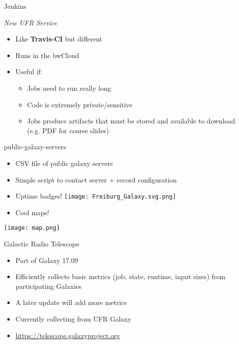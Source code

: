 \documentclass[12pt]{ufrslides}
\begin{document}
	{%
		\begin{frame}[plain]
		\end{frame}
	}

	\begin{frame}{Jenkins}
		\begin{center}
			\emph{New UFR Service}
		\end{center}
		\begin{itemize}
			\item Like \textbf{Travis-CI} but different
			\item Runs in the bwCloud
			\item Useful if:
				\begin{itemize}
					\item Jobs need to run really long
					\item Code is extremely private/sensitive
					\item Jobs produce artifacts that must be stored and
						available to download (e.g. PDF for course slides)
				\end{itemize}
		\end{itemize}
	\end{frame}

	\begin{frame}{public-galaxy-servers}
		\begin{itemize}
			\item CSV file of public galaxy servers
			\item Simple script to contact server + record configuration
			\item Uptime badges! \texttt{[image: Freiburg\_Galaxy.svg.png]}
			\item Cool maps!
		\end{itemize}
		\texttt{[image: map.png]}
	\end{frame}

	\begin{frame}{Galactic Radio Telescope}
		\begin{itemize}
			\item Part of Galaxy 17.09
			\item Efficiently collects basic metrics (job, state, runtime, input sizes) from participating Galaxies
			\item A later update will add more metrics
			\item Currently collecting from UFR Galaxy
			\item \url{https://telescope.galaxyproject.org}
		\end{itemize}
	\end{frame}
\end{document}
